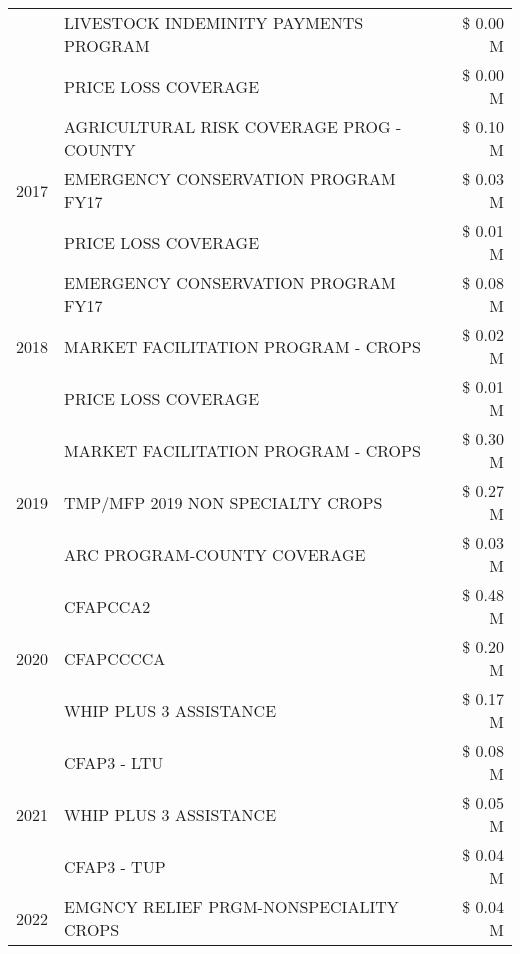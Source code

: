 \begin{tabular}{llr}
 & LIVESTOCK INDEMINITY PAYMENTS PROGRAM & \$ 0.00 M \\
 & PRICE LOSS COVERAGE & \$ 0.00 M \\
\cline{1-3}
\multirow[t]{3}{*}{2017} & AGRICULTURAL RISK COVERAGE PROG - COUNTY & \$ 0.10 M \\
 & EMERGENCY CONSERVATION PROGRAM FY17 & \$ 0.03 M \\
 & PRICE LOSS COVERAGE & \$ 0.01 M \\
\cline{1-3}
\multirow[t]{3}{*}{2018} & EMERGENCY CONSERVATION PROGRAM FY17 & \$ 0.08 M \\
 & MARKET FACILITATION PROGRAM - CROPS & \$ 0.02 M \\
 & PRICE LOSS COVERAGE & \$ 0.01 M \\
\cline{1-3}
\multirow[t]{3}{*}{2019} & MARKET FACILITATION PROGRAM - CROPS & \$ 0.30 M \\
 & TMP/MFP 2019 NON SPECIALTY CROPS & \$ 0.27 M \\
 & ARC PROGRAM-COUNTY COVERAGE & \$ 0.03 M \\
\cline{1-3}
\multirow[t]{3}{*}{2020} & CFAPCCA2 & \$ 0.48 M \\
 & CFAPCCCCA & \$ 0.20 M \\
 & WHIP PLUS 3 ASSISTANCE & \$ 0.17 M \\
\cline{1-3}
\multirow[t]{3}{*}{2021} & CFAP3 - LTU & \$ 0.08 M \\
 & WHIP PLUS 3 ASSISTANCE & \$ 0.05 M \\
 & CFAP3 - TUP & \$ 0.04 M \\
\cline{1-3}
2022 & EMGNCY RELIEF PRGM-NONSPECIALITY CROPS & \$ 0.04 M \\
\cline{1-3}
\bottomrule
\end{tabular}
